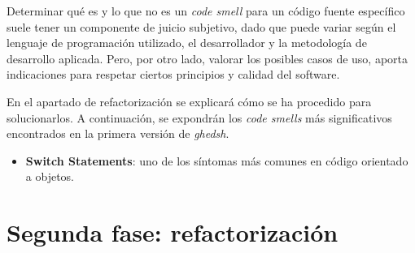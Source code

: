 Determinar qué es y lo que no es un {\it code smell} para un código fuente específico suele tener un componente de juicio subjetivo, dado que puede variar según el lenguaje de programación utilizado, el desarrollador y la metodología de desarrollo aplicada. Pero, por otro lado, valorar 
los posibles casos de uso, aporta indicaciones para respetar ciertos principios y calidad del software.
\bigskip

En el apartado de refactorización se explicará cómo se ha procedido para solucionarlos. A continuación, se expondrán los {\it code smells} más significativos encontrados en la primera versión de {\it ghedsh}. 
\begin{itemize}
  \item \textbf{Switch Statements}: uno de los síntomas más comunes en código orientado a objetos.
\end{itemize}

  
\section{Segunda fase: refactorización}
\label{2:sec:2}

